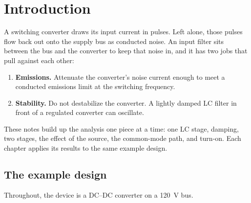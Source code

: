 \chapter{Introduction}
\label{ch:intro}

A switching converter draws its input current in pulses. Left alone, those
pulses flow back out onto the supply bus as conducted noise. An input filter
sits between the bus and the converter to keep that noise in, and it has two
jobs that pull against each other:

\begin{enumerate}
	\item \textbf{Emissions.} Attenuate the converter's noise current enough to
	      meet a conducted emissions limit at the switching frequency.
	\item \textbf{Stability.} Do not destabilize the converter. A lightly damped
	      LC filter in front of a regulated converter can oscillate.
\end{enumerate}

These notes build up the analysis one piece at a time: one LC stage,
damping, two stages, the effect of the source, the common-mode path, and
turn-on. Each chapter applies its results to the same example design.

\section{The example design}
\label{sec:example-spec}

Throughout, the device is a DC--DC converter on a \qty{120}{\volt} bus.

